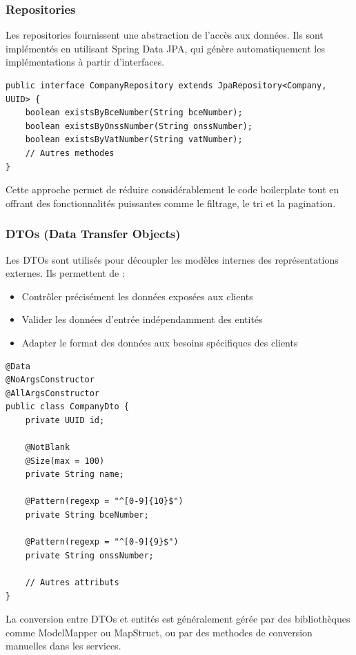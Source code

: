 \documentclass[12pt,a4paper]{report}
\begin{document}
\subsubsection{Repositories}

Les repositories fournissent une abstraction de l'accès aux données. Ils sont implémentés en utilisant Spring Data JPA, qui génère automatiquement les implémentations à partir d'interfaces.

\begin{lstlisting}
public interface CompanyRepository extends JpaRepository<Company, UUID> {
    boolean existsByBceNumber(String bceNumber);
    boolean existsByOnssNumber(String onssNumber);
    boolean existsByVatNumber(String vatNumber);
    // Autres methodes
}
\end{lstlisting}

Cette approche permet de réduire considérablement le code boilerplate tout en offrant des fonctionnalités puissantes comme le filtrage, le tri et la pagination.

\subsubsection{DTOs (Data Transfer Objects)}

Les DTOs sont utilisés pour découpler les modèles internes des représentations externes. Ils permettent de :
\begin{itemize}
  \item Contrôler précisément les données exposées aux clients
  \item Valider les données d'entrée indépendamment des entités
  \item Adapter le format des données aux besoins spécifiques des clients
\end{itemize}

\begin{lstlisting}
@Data
@NoArgsConstructor
@AllArgsConstructor
public class CompanyDto {
    private UUID id;
    
    @NotBlank
    @Size(max = 100)
    private String name;
    
    @Pattern(regexp = "^[0-9]{10}$")
    private String bceNumber;
    
    @Pattern(regexp = "^[0-9]{9}$")
    private String onssNumber;
    
    // Autres attributs
}
\end{lstlisting}

La conversion entre DTOs et entités est généralement gérée par des bibliothèques comme ModelMapper ou MapStruct, ou par des methodes de conversion manuelles dans les services.
\end{document}
